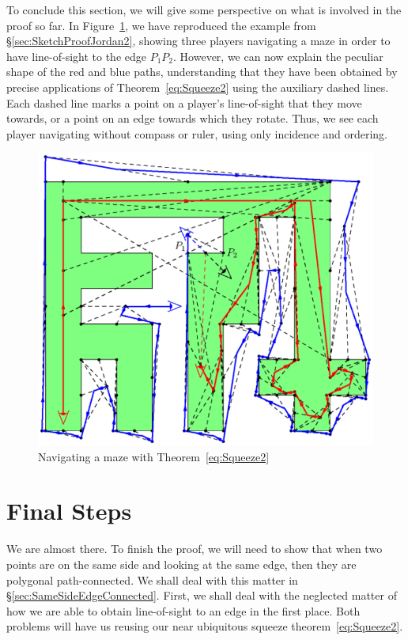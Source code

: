 To conclude this section, we will give some perspective on what is involved in the proof so far. In Figure~\ref{fig:SketchProofJordan2Full}, we have reproduced the example from \S\ref{sec:SketchProofJordan2}, showing three players navigating a maze in order to have line-of-sight to the edge $P_1P_2$. However, we can now explain the peculiar shape of the red and blue paths, understanding that they have been obtained by precise applications of Theorem~\ref{eq:Squeeze2} using the auxiliary dashed lines. Each dashed line marks a point on a player's line-of-sight that they move towards, or a point on an edge towards which they rotate. Thus, we see each player navigating without compass or ruler, using only incidence and ordering.

\begin{figure}
  \centering\includegraphics[scale=0.9]{jordanVerification2/SketchProofFull}
  \caption{Navigating a maze with Theorem~\ref{eq:Squeeze2}}
  \label{fig:SketchProofJordan2Full}
\end{figure}

\section{Final Steps}
We are almost there. To finish the proof, we will need to show that when two points are on the same side and looking at the same edge, then they are polygonal path-connected. We shall deal with this matter in \S\ref{sec:SameSideEdgeConnected}. First, we shall deal with the neglected matter of how we are able to obtain line-of-sight to an edge in the first place. Both problems will have us reusing our near ubiquitous squeeze theorem~\eqref{eq:Squeeze2}.

